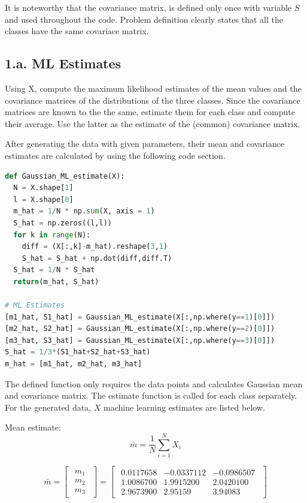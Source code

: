\documentclass[11pt]{article}
\begin{document}
It is noteworthy that the covariance matrix, is defined only once with variable $S$ and used throughout the code. Problem definition clearly states that all the classes have the same covariace matrix.

\subsection*{1.a. ML Estimates} Using X, compute the maximum likelihood estimates of the mean values and the covariance matrices of the distributions of the three classes. Since the covariance matrices are known to the the same, estimate them for each class and compute their average. Use the latter as the estimate of the (common) covariance matrix.

After generating the data with given parameters, their mean and covariance estimates are calculated by using the following code section.

\begin{lstlisting}[language=Python, caption=Gaussian ML estimates]
def Gaussian_ML_estimate(X):
  N = X.shape[1]
  l = X.shape[0]
  m_hat = 1/N * np.sum(X, axis = 1)
  S_hat = np.zeros((l,l))
  for k in range(N):
    diff = (X[:,k]-m_hat).reshape(3,1)
    S_hat = S_hat + np.dot(diff,diff.T)
  S_hat = 1/N * S_hat
  return(m_hat, S_hat)
  
# ML Estimates
[m1_hat, S1_hat] = Gaussian_ML_estimate(X[:,np.where(y==1)[0]])
[m2_hat, S2_hat] = Gaussian_ML_estimate(X[:,np.where(y==2)[0]])
[m3_hat, S3_hat] = Gaussian_ML_estimate(X[:,np.where(y==3)[0]])
S_hat = 1/3*(S1_hat+S2_hat+S3_hat)
m_hat = [m1_hat, m2_hat, m3_hat]
\end{lstlisting}

The defined function only requires the data points and calculates Gaussian mean and covariance matrix. The estimate function is called for each class separately. For the generated data, $X$ machine learning estimates are listed below. \medskip

Mean estimate:
$$
\bar{m} = \frac{1}{N}\sum_{i=1}^N X_i
$$

$$
\bar{m}=
 \begin{bmatrix}
 \begin{array}{c}
    m_1 \\
    m_2 \\
    m_3 
\end{array}   
\end{bmatrix} = 
 \begin{bmatrix}
 \begin{array}{rrr}
    0.0117658  &-0.0337112  &-0.0986507 \\
    1.0086700   &1.9915200  &2.0420100 \\
    2.9673900   &2.95159    &3.94083 
\end{array}   
\end{bmatrix}
$$
\end{document}
